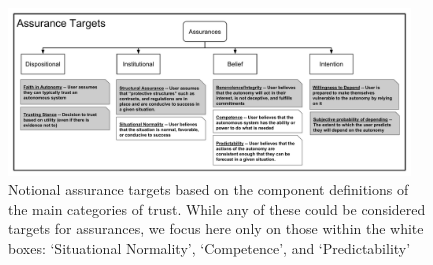         \begin{figure}[t]%
            \includegraphics[width=0.95\textwidth]{Figures/Assurances.pdf}%
            \caption{Notional assurance targets based on the component definitions of the main categories of trust. While any of these could be considered targets for assurances, we focus here only on those within the white boxes: `Situational Normality', `Competence', and `Predictability'}
            \label{fig:Assurance_classes}
        \end{figure}
